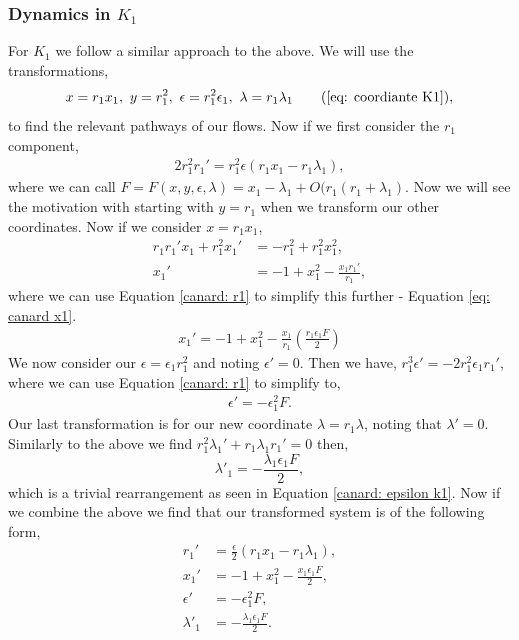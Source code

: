 \subsubsection{Dynamics in \texorpdfstring{$K_1$}{K1}}\label{sec:dynamics-in-texorpdfstringk1k1}
For $K_1$ we follow a similar approach to the above. We will use the transformations, 
\begin{equation}
x=r_1x_1, \ y=r_1^2, \ \epsilon=r_1^2\epsilon_1, \ \lambda=r_1\lambda_1 \tag{\ref{eq: coordiante K1}},
\end{equation}
to find the relevant pathways of our flows. Now if we first consider the $r_1$ component, 
\begin{align}
2r_1^2r_1'=r_1^2\epsilon(r_1x_1-r_1\lambda_1), \label{canard: r1}
\end{align}
where we can call $F=F(x,y,\epsilon,\lambda)=x_1-\lambda_1+O(r_1(r_1+\lambda_1)$. Now we will see the motivation with starting with $y=r_1$ when we transform our other coordinates. Now if we consider $x=r_1x_1$,
\begin{align*}
r_1r_1'x_1+r_1^2x_1'&=-r_1^2+r_1^2x_1^2,\\
x_1'&=-1+x_1^2-\frac{x_1r_1'}{r_1},
\end{align*}
where we can use Equation \ref{canard: r1} to simplify this further - Equation \ref{eq: canard x1}.
\begin{align}
x_1'=-1+x_1^2-\frac{x_1}{r_1}\left(\frac{r_1\epsilon_1F}{2}\right) \label{eq: canard x1}
\end{align}
We now consider our $\epsilon=\epsilon_1r_1^2$ and noting $\epsilon'=0$. Then we have, $r_1^3\epsilon'=-2r_1^2\epsilon_1r_1'$, where we can use Equation \ref{canard: r1} to simplify to,
\begin{align}
\epsilon'=-\epsilon_1^2F. \label{canard: epsilon k1}
\end{align}
Our last transformation is for our new coordinate $\lambda=r_1\lambda$, noting that $\lambda'=0$. Similarly to the above we find $r_1^2\lambda_1'+r_1\lambda_1r_1'=0$ then, 
\begin{equation}
\lambda'_1=-\frac{\lambda_1\epsilon_1F}{2}, 
\end{equation}
which is a trivial rearrangement as seen in Equation \ref{canard: epsilon k1}. Now if we combine the above we find that our transformed system is of the following form,
\begin{subequations}
	\begin{align}
	r_1'&=\frac{\epsilon}{2}(r_1x_1-r_1\lambda_1), \\
	x_1'&=-1+x_1^2-\frac{x_1\epsilon_1F}{2},\\
	\epsilon'&=-\epsilon_1^2F,\\
	\lambda'_1&=-\frac{\lambda_1\epsilon_1F}{2}.
	\end{align}
	\label{canard: system of equations}
\end{subequations}
